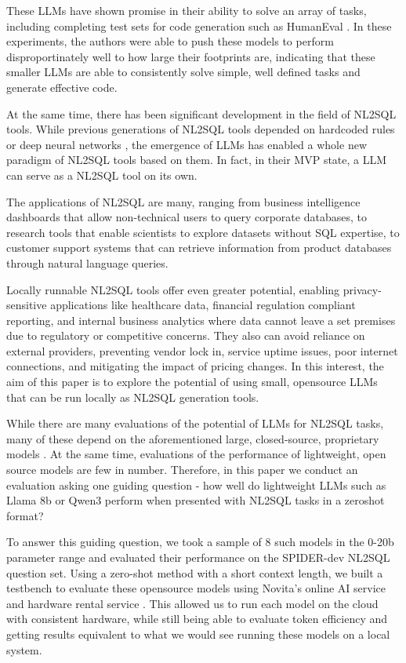 \documentclass[sigconf]{acmart}
\begin{document}
These LLMs have shown promise in their ability to solve an array of tasks, including completing test sets for code 
generation such as HumanEval \cite{hasan2025smallcode, corradini2025slmsurvey}. In these experiments, the authors
were able to push these models to perform disproportinately well to how large their footprints are, indicating that 
these smaller LLMs are able to consistently solve simple, well defined tasks and generate effective code.

At the same time, there has been significant development in the field of NL2SQL tools. While previous generations of 
NL2SQL tools depended on hardcoded rules or deep neural networks \cite{nl2sqlsurvey}, the emergence of LLMs has enabled
a whole new paradigm of NL2SQL tools based on them. In fact, in their MVP state, a LLM can serve as a NL2SQL tool
on its own. 

The applications of NL2SQL are many, ranging from business intelligence dashboards that allow non-technical users to 
query corporate databases, to research tools that enable scientists to explore datasets without SQL expertise, to 
customer support systems that can retrieve information from product databases through natural language queries. 

Locally runnable NL2SQL tools offer even greater potential, enabling privacy-sensitive applications like healthcare data, 
financial regulation compliant reporting, and internal business analytics where data cannot leave a set premises
due to regulatory or competitive concerns. They also can avoid reliance on external providers,
preventing vendor lock in, service uptime issues, poor internet connections, and mitigating the impact of pricing changes.
In this interest, the aim of this paper is to explore the potential of using small, opensource LLMs that can be run 
locally as NL2SQL generation tools. 

While there are many evaluations of the potential of LLMs for NL2SQL tasks, many of these depend on the aforementioned
large, closed-source, proprietary models \cite{pei2025feather_sql, nl2sqlsurvey, liu2024survey_nl2sql}. At the same 
time, evaluations of the performance of lightweight, open source models are few in number. Therefore, in this paper we
conduct an evaluation asking one guiding question - how well do lightweight LLMs such as Llama 8b or Qwen3 perform when 
presented with NL2SQL tasks in a zeroshot format? 

To answer this guiding question, we took a sample of 8 such models in the 0-20b parameter range and evaluated their 
performance on the SPIDER-dev NL2SQL question set. Using a zero-shot method with a short context length, we built a 
testbench \cite{sourceCode} to evaluate these opensource models using Novita's online AI service and hardware rental service \cite{novitaAI}.
This allowed us to run each model on the cloud with consistent hardware, while still being able to evaluate token efficiency
and getting results equivalent to what we would see running these models on a local system.
\end{document}
